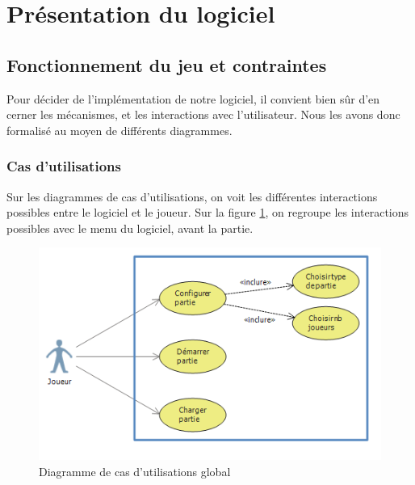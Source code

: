 \section{Présentation du logiciel}

\subsection{Fonctionnement du jeu et contraintes}
Pour décider de l'implémentation de notre logiciel, il convient bien sûr d'en cerner les mécanismes, et les interactions avec l'utilisateur. Nous les avons donc formalisé au moyen de différents diagrammes.

\subsubsection{Cas d'utilisations}
Sur les diagrammes de cas d'utilisations, on voit les différentes interactions possibles entre le logiciel et le joueur. Sur la figure \ref{casdut1}, on regroupe les interactions possibles avec le menu du logiciel, avant la partie. 

\begin{figure}[!h] 
\centerline{\includegraphics[width=\textwidth]{img/ucd_ihm_menus.png}}
   \caption{\label{étiquette} Diagramme de cas d'utilisations global}
\label{casdut1}
\end{figure}

